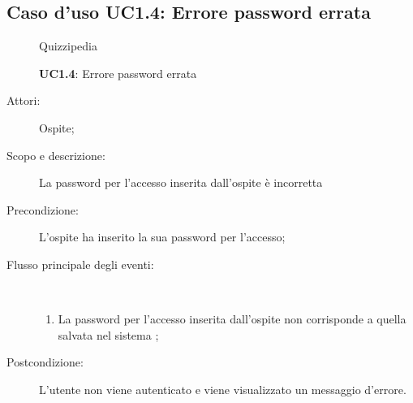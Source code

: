\subsection{Caso d'uso UC1.4: Errore password errata}
	\begin{figure}[H]
		\centering
		\begin{resizedtikzpicture}{\textwidth}
		\begin{umlsystem}[x=0, fill=lightgray!20]{Quizzipedia}
		\end{umlsystem}
		\end{resizedtikzpicture}
		\caption{\textbf{UC1.4}: Errore password errata}
		\label{UC1.4}
	\end{figure}
\begin{description}
\item[Attori:] Ospite;
\item[Scopo e descrizione:] La password per l'accesso inserita dall'ospite è incorretta
      \item[Precondizione:] L'ospite ha inserito la sua password per l'accesso;

        \item[Flusso principale degli eventi:] \ 
 \begin{enumerate}
          \item La password per l'accesso inserita dall'ospite non corrisponde a quella salvata nel sistema
;

      \end{enumerate}
    \item[Postcondizione:] L'utente non viene autenticato e viene visualizzato un messaggio d'errore.
  \end{description}
\hypertarget{UC2}{}
